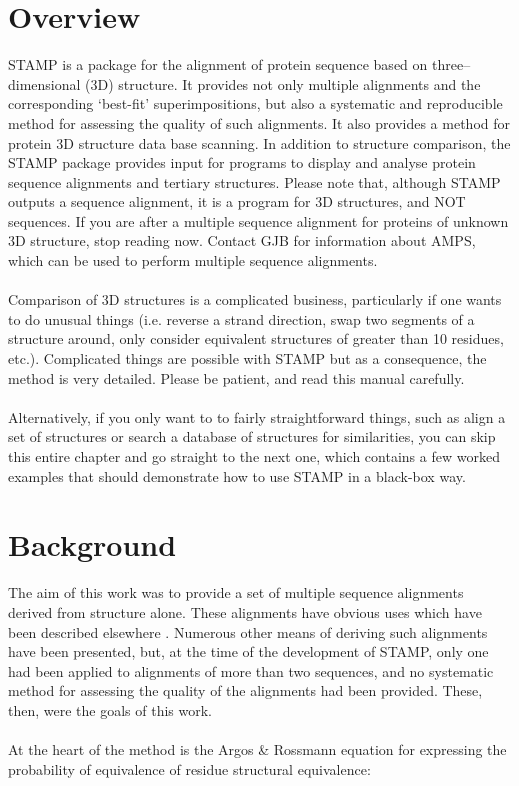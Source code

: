 \section{Overview}

STAMP is a package for the alignment of protein sequence based on
three--dimensional (3D) structure.  It provides not only multiple
alignments and the corresponding `best-fit' superimpositions, but
also a systematic and reproducible method for assessing the
quality of such alignments.  It also provides a method for protein
3D structure data base scanning.  In addition to structure
comparison, the STAMP package provides input for programs to
display and analyse protein sequence alignments and tertiary structures.
Please note that, although STAMP outputs a sequence alignment, it is 
a program for 3D structures, and NOT sequences.  If 
you are after a multiple sequence alignment for proteins of unknown 3D 
structure, stop reading now.  Contact GJB for information
about AMPS, which can be used to perform multiple sequence
alignments.\\
\\
Comparison of 3D structures is a complicated
business, particularly if one wants to do unusual things (i.e.
reverse a strand direction, swap two segments of a structure
around, only consider equivalent structures of greater
than 10 residues, etc.).  Complicated things are possible with STAMP but
as a consequence, the method is very detailed.  Please be patient, and 
read this manual carefully.\\
\\
Alternatively, if you only want to to fairly straightforward things, such
as align a set of structures or search a database of structures for
similarities, you can skip this entire chapter and go straight to the
next one, which contains a few worked examples that should demonstrate how
to use STAMP in a black-box way.

\section{Background}

The aim of this work was to provide a set of multiple sequence
alignments derived from structure alone.  These alignments have 
obvious uses which have been described elsewhere \cite{rb92b,sali90}.  
Numerous other means of deriving such alignments have been 
presented, but, at the time of the development of STAMP, only one had
been applied to alignments of more than two sequences, and no 
systematic method for assessing the quality of the alignments had 
been provided.  These, then, were the goals of this work.\\
\\
At the heart of the method is the Argos \& Rossmann \cite{argos76}
equation for expressing the probability of equivalence of
residue structural equivalence:\\

